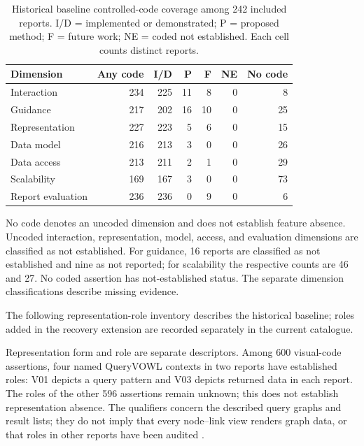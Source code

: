 \documentclass[manuscript,review,screen]{acmart}
\begin{document}
\begin{table}[htbp]

\centering\small

\caption{Historical baseline controlled-code coverage among 242 included reports. I/D = implemented or demonstrated; P = proposed method; F = future work; NE = coded not established. Each cell counts distinct reports.}

\label{tab:retrospective-code-coverage}

\begin{tabular}{@{}lrrrrrr@{}}

\toprule Dimension & Any code & I/D & P & F & NE & No code\\\midrule

Interaction & 234 & 225 & 11 & 8 & 0 & 8\\

Guidance & 217 & 202 & 16 & 10 & 0 & 25\\

Representation & 227 & 223 & 5 & 6 & 0 & 15\\

Data model & 216 & 213 & 3 & 0 & 0 & 26\\

Data access & 213 & 211 & 2 & 1 & 0 & 29\\

Scalability & 169 & 167 & 3 & 0 & 0 & 73\\

Report evaluation & 236 & 236 & 0 & 9 & 0 & 6\\

\bottomrule\end{tabular}

\end{table}

No code denotes an uncoded dimension and does not establish feature absence. Uncoded interaction, representation, model, access, and evaluation dimensions are classified as not established. For guidance, 16 reports are classified as not established and nine as not reported; for scalability the respective counts are 46 and 27. No coded assertion has not-established status. The separate dimension classifications describe missing evidence.

The following representation-role inventory describes the historical baseline; roles added in the recovery extension are recorded separately in the current catalogue.

Representation form and role are separate descriptors. Among 600 visual-code assertions, four named QueryVOWL contexts in two reports have established roles: V01 depicts a query pattern and V03 depicts returned data in each report. The roles of the other 596 assertions remain unknown; this does not establish representation absence. The qualifiers concern the described query graphs and result lists; they do not imply that every node--link view renders graph data, or that roles in other reports have been audited \citep{V3-02190,V3-02191}.
\end{document}
